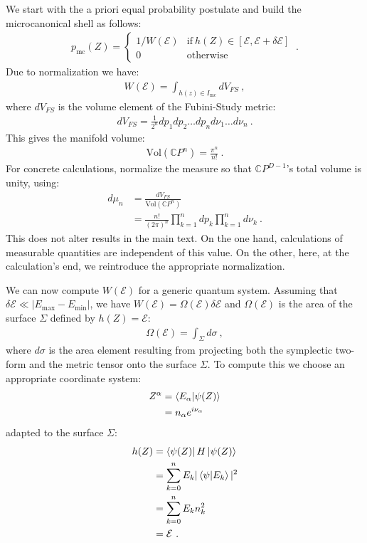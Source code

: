 \documentclass[draft,nofootinbib,pre,twocolumn,showpacs,showkeys,groupaddress,preprintnumbers,floatfix]{revtex4-1}
\newcommand{\1}{\mathbbm{1}}
\begin{document}
We start with the a priori equal probability postulate and build the microcanonical shell as follows:
\begin{align*}
p_{\mathrm{mc}}(Z) = 
  \begin{cases}
  1 / W(\mathcal{E}) & \mathrm{if}
  ~h(Z) \in [\mathcal{E},\mathcal{E} + \delta \mathcal{E}] \\
  0 & \mathrm{otherwise}
  \end{cases}
  ~.
\end{align*}
Due to normalization we have:
\begin{align*}
W(\mathcal{E}) = \int_{h(z)\in I_{\mathrm{mc}}}  dV_{FS}
  ~,
\end{align*}
where $dV_{FS}$ is the volume element of the Fubini-Study metric:
\begin{align*}
dV_{FS} = \frac{1}{2^n} dp_1 dp_2 \ldots dp_n d\nu_1 \ldots d\nu_n
  ~.
\end{align*}
This gives the manifold volume:
\begin{align*}
\mathrm{Vol}(\mathbb{C}P^n) = \frac{\pi^n}{n!}
  ~.
\end{align*}
For concrete calculations, normalize the measure so that $\mathbb{C}P^{D-1}$'s
total volume is unity, using:
\begin{align*}
d \mu_{n} & = \frac{dV_{FS}}{\mathrm{Vol}(\mathbb{C}P^n)} \\
  & = \frac{n!}{(2\pi)^n} \prod_{k=1}^n dp_k \prod_{k=1}^n d\nu_k 
  ~.
\end{align*}
This does not alter results in the main text. On the one hand, calculations of
measurable quantities are independent of this value. On the other, here, at the
calculation's end, we reintroduce the appropriate normalization.

We can now compute $W(\mathcal{E})$ for a generic quantum system. Assuming that
$\delta \mathcal{E} \ll \vert E_{\mathrm{max}}- E_{\mathrm{min}}\vert$, we have
$W(\mathcal{E}) = \Omega(\mathcal{E}) \delta \mathcal{E}$ and $\Omega(\mathcal{E})$ is
the area of the surface $\Sigma$ defined by $h(Z) = \mathcal{E}$:
\begin{align*}
\Omega(\mathcal{E}) = \int_\Sigma d \sigma
  ~,
\end{align*}
where $d\sigma$ is the area element resulting from projecting both the
symplectic two-form and the metric tensor onto the surface $\Sigma$. To compute
this we choose an appropriate coordinate system:
\begin{align*}
Z^\alpha & = \braket{E_\alpha}{\psi(Z)} \\
  & = n_\alpha e^{i\nu_\alpha}
\end{align*}
adapted to the surface $\Sigma$:
\begin{align*}
h(Z) & = \bra{\psi(Z)} H \ket{\psi(Z)} \\
  & = \sum_{k=0}^n E_k |\braket{\psi}{E_k}|^2 \\
  & = \sum_{k=0}^n E_k n^2_k \\
  & = \mathcal{E}
  ~.
\end{align*}
\end{document}
